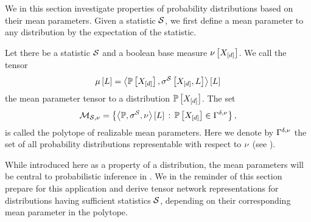 
We in this section investigate properties of probability distributions based on their mean parameters.
Given a statistic $\mathcal{S}$, we first define a mean parameter to any distribution by the expectation of the statistic.

\begin{definition}
    \label{def:meanPolytope}
    Let there be a statistic $\mathcal{S}$ and a boolean base measure $\nu\left[X_{[d]}\right]$.
    We call the tensor
    \begin{align*}
        \mu\left[L\right]
        = \left\langle \mathbb{P}\left[X_{[d]}\right],\sigma^{\mathcal{S}}\left[X_{[d]},L\right]\right\rangle \left[ L \right]
    \end{align*}
    the mean parameter tensor to a distribution $\mathbb{P}\left[X_{[d]}\right]$.
    The set
    \begin{align*}
        \mathcal{M}_{\mathcal{S},\nu}
        = \left\{\left\langle \mathbb{P},\sigma^{\mathcal{S}},\nu\right\rangle \left[ L \right]\,:\,\mathbb{P}\left[X_{[d]}\right]\in\Gamma^{\delta,\nu} \right\},
    \end{align*}
    is called the polytope of realizable mean parameters.
    Here we denote by $\Gamma^{\delta,\nu}$ the set of all probability distributions representable with respect to $\nu$ (see ).
\end{definition}

While introduced here as a property of a distribution, the mean parameters will be central to probabilistic inference in .
We in the reminder of this section prepare for this application and derive tensor network representations for distributions having sufficient statistics $\mathcal{S}$, depending on their corresponding mean parameter in the polytope.



